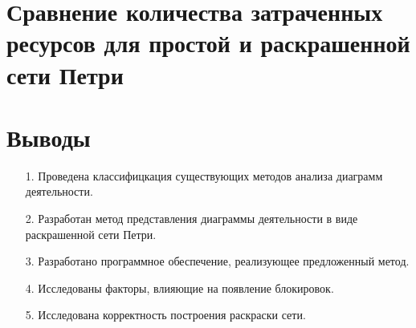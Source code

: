\documentclass[12pt]{article}
\begin{document}
\section{Сравнение количества затраченных ресурсов для простой и раскрашенной сети Петри}

\begin{center}
	\centering
\end{center}

\section{Выводы}

\begin{enumerate}
\item[1.] Проведена классифицкация существующих методов анализа диаграмм деятельности.
\item[2.] Разработан метод представления диаграммы деятельности в виде раскрашенной сети Петри.
\item[3.] Разработано программное обеспечение, реализующее предложенный метод.
\item[4.] Исследованы факторы, влияющие на появление блокировок.
\item[5.] Исследована корректность построения раскраски сети.
\end{enumerate}
\end{document}
